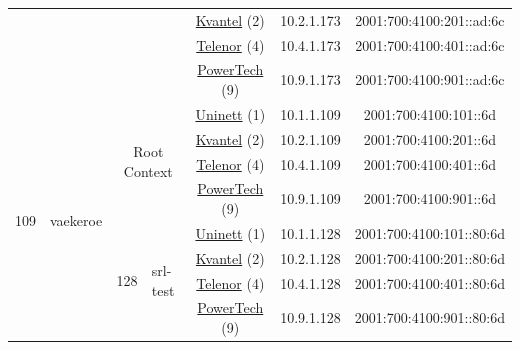 \begin{small}
\begin{center}
\begin{longtable}{|c|c|c|c|c|c|c|c|}
  &  &  &  & \multicolumn{2}{|c|}{\tiny{\href{http://kvantel.no}{Kvantel} (2)}} & \tiny{10.2.1.173} & \tiny{2001:700:4100:201::ad:6c} \\* \cline{5-5}\cline{6-6}\cline{7-7}\cline{8-8}
  &  &  &  & \multicolumn{2}{|c|}{\tiny{\href{https://www.telenor.no}{Telenor} (4)}} & \tiny{10.4.1.173} & \tiny{2001:700:4100:401::ad:6c} \\* \cline{5-5}\cline{6-6}\cline{7-7}\cline{8-8}
  &  &  &  & \multicolumn{2}{|c|}{\tiny{\href{http://www.powertech.no}{PowerTech} (9)}} & \tiny{10.9.1.173} & \tiny{2001:700:4100:901::ad:6c} \\ \hline
 \multirow{24}{*}{\tiny{109}} & \multicolumn{1}{|l|}{\multirow{24}{*}{\tiny{vaekeroe}}} & \multicolumn{2}{|c|}{\multirow{4}{*}{\tiny{Root Context}}} & \multicolumn{2}{|c|}{\tiny{\href{https://www.uninett.no}{Uninett} (1)}} & \tiny{10.1.1.109} & \tiny{2001:700:4100:101::6d} \\* \cline{5-5}\cline{6-6}\cline{7-7}\cline{8-8}
  &  & \multicolumn{2}{|c|}{} & \multicolumn{2}{|c|}{\tiny{\href{http://kvantel.no}{Kvantel} (2)}} & \tiny{10.2.1.109} & \tiny{2001:700:4100:201::6d} \\* \cline{5-5}\cline{6-6}\cline{7-7}\cline{8-8}
  &  & \multicolumn{2}{|c|}{} & \multicolumn{2}{|c|}{\tiny{\href{https://www.telenor.no}{Telenor} (4)}} & \tiny{10.4.1.109} & \tiny{2001:700:4100:401::6d} \\* \cline{5-5}\cline{6-6}\cline{7-7}\cline{8-8}
  &  & \multicolumn{2}{|c|}{} & \multicolumn{2}{|c|}{\tiny{\href{http://www.powertech.no}{PowerTech} (9)}} & \tiny{10.9.1.109} & \tiny{2001:700:4100:901::6d} \\* \cline{3-3}\cline{4-4}\cline{5-5}\cline{6-6}\cline{7-7}\cline{8-8}
  &  & \multirow{4}{*}{\tiny{128}} & \multicolumn{1}{|l|}{\multirow{4}{*}{\tiny{srl-test}}} & \multicolumn{2}{|c|}{\tiny{\href{https://www.uninett.no}{Uninett} (1)}} & \tiny{10.1.1.128} & \tiny{2001:700:4100:101::80:6d} \\* \cline{5-5}\cline{6-6}\cline{7-7}\cline{8-8}
  &  &  &  & \multicolumn{2}{|c|}{\tiny{\href{http://kvantel.no}{Kvantel} (2)}} & \tiny{10.2.1.128} & \tiny{2001:700:4100:201::80:6d} \\* \cline{5-5}\cline{6-6}\cline{7-7}\cline{8-8}
  &  &  &  & \multicolumn{2}{|c|}{\tiny{\href{https://www.telenor.no}{Telenor} (4)}} & \tiny{10.4.1.128} & \tiny{2001:700:4100:401::80:6d} \\* \cline{5-5}\cline{6-6}\cline{7-7}\cline{8-8}
  &  &  &  & \multicolumn{2}{|c|}{\tiny{\href{http://www.powertech.no}{PowerTech} (9)}} & \tiny{10.9.1.128} & \tiny{2001:700:4100:901::80:6d} \\* \cline{3-3}\cline{4-4}\cline{5-5}\cline{6-6}\cline{7-7}\cline{8-8}

\end{longtable}
\end{center}
\end{small}
